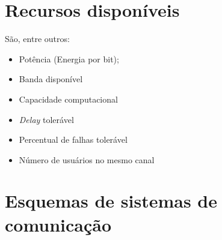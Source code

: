\documentclass[12pt]{book}
\begin{document}
\section{Recursos disponíveis}
São, entre outros:
\begin{itemize}[nosep,label=-]
\item Potência (Energia por bit);
\item Banda disponível
\item Capacidade computacional
\item \textit{Delay} tolerável
\item Percentual de falhas tolerável
\item Número de usuários no mesmo canal
\end{itemize}

\newpage
\section*{Esquemas de sistemas de comunicação}
\end{document}
